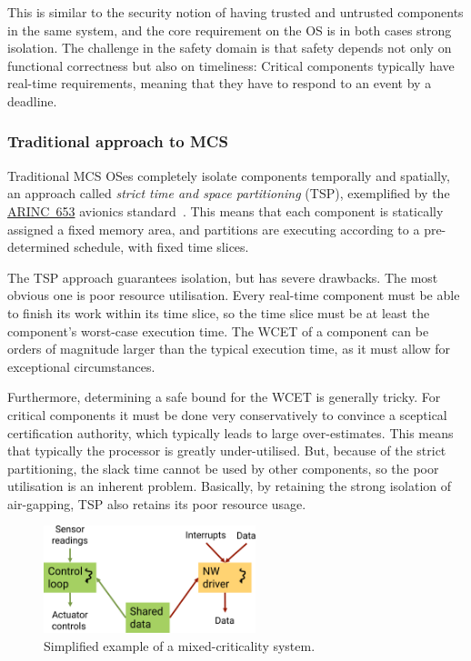 \documentclass[english,a4paper,12pt]{report}
\newcommand{\SSSect}[1]{\subsubsection*{#1}}
\newcommand{\SSSect}[1]{\subsection*{#1}}
\begin{document}
  This is similar to the security notion of having trusted and
  untrusted components in the same system, and the core requirement on
  the OS is in both cases strong isolation. The challenge in the
  safety domain is that safety depends not only on functional
  correctness but also on timeliness: Critical components typically
  have real-time requirements, meaning that they have to respond to an
  event by a deadline.

  \SSSect{Traditional approach to MCS}

  Traditional MCS OSes completely isolate components temporally and
  spatially, an approach called \emph{strict time and space
    partitioning} (TSP), exemplified by the
  \href{https://en.wikipedia.org/wiki/ARINC_653}{ARINC~653} avionics
  standard~\citep{ARINC653_12}. This means that each component is
  statically assigned a fixed memory area, and partitions are
  executing according to a pre-determined schedule, with fixed time
  slices.

  The TSP approach guarantees isolation, but has severe drawbacks. The
  most obvious one is poor resource utilisation. Every real-time component must
  be able to finish its work within its time slice, so the time slice
  must be at least the component's worst-case execution time.
  The WCET of a component can be orders of magnitude larger
  than the typical execution time, as it must allow for exceptional circumstances.

  Furthermore, determining a safe bound for the WCET is generally
  tricky. For critical components it must be done very conservatively
  to convince a sceptical certification authority, which typically
  leads to large over-estimates. This means that typically the
  processor is greatly under-utilised. But, because of the strict
  partitioning, the slack time cannot be used by other components, so
  the poor utilisation is an inherent problem. Basically, by retaining
  the strong isolation of air-gapping, TSP also retains its poor
  resource usage.

  \begin{figure}[b]
    \centering
    \includegraphics[width=0.55\textwidth]{mcs}
    \caption{Simplified example of a mixed-criticality system.}
    \label{f:mcs}
  \end{figure}
\end{document}
